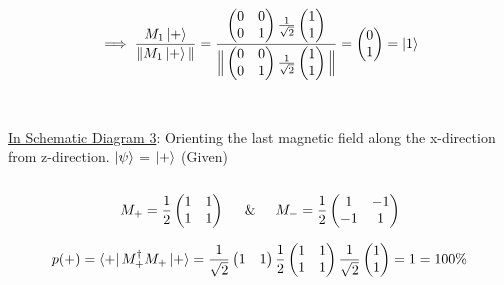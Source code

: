 \documentclass[a4paper, 12pt]{article}
\begin{document}
\begin{flushleft}
\[\implies \frac{M_{1} \ket{+}}{\|M_{1} \ket{+}\|} = \frac{ \begin{pmatrix}
    0 & 0\\
    0 & 1\\
\end{pmatrix} \frac{1}{\sqrt{2}}\begin{pmatrix}
    1 \\
    1 \\
\end{pmatrix}}{\Big\| \begin{pmatrix}
    0 & 0\\
    0 & 1\\
\end{pmatrix} \frac{1}{\sqrt{2}}\begin{pmatrix}
    1 \\
    1 \\
\end{pmatrix}\Big\|}  = \begin{pmatrix}
    0 \\
    1 \\
\end{pmatrix} =\ket{1}\]\\~\\

\underline{In Schematic Diagram 3}: Orienting the last magnetic field along the x-direction from z-direction.
$\ket{\psi}$ = $\ket{+}$ (Given)\\~\\

\[M_{+} = \frac{1}{2}\begin{pmatrix}
    1 & 1\\
    1 & 1\\
\end{pmatrix} \hspace{5mm} \& \hspace{5mm} M_{-}=\frac{1}{2}\begin{pmatrix}
    1 & -1\\
    -1 & 1\\
\end{pmatrix}\]

\[p(+)=\bra{+}M_{+}^{\dagger}M_{+}\ket{+} = \frac{1}{\sqrt{2}}\begin{pmatrix}
    1 & 1\\
\end{pmatrix} \frac{1}{2}\begin{pmatrix}
    1 & 1 \\
    1 & 1 \\
\end{pmatrix} \frac{1}{\sqrt{2}} \begin{pmatrix}
    1 \\
    1 \\
\end{pmatrix} = 1 = 100\%\]


\end{flushleft}
\end{document}
